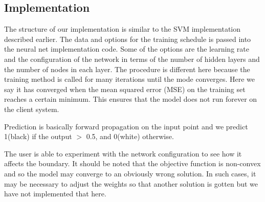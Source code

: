 \documentclass[11pt,letterpaper]{article}
\begin{document}
\subsection{Implementation}
The structure of our implementation is similar to the SVM implementation described earlier. The data and options for the training schedule is passed into the neural net implementation code. Some of the options are the learning rate and the configuration of the network in terms of the number of hidden layers and the number of nodes in each layer.  The procedure is different here because the training method is called for many iterations until the mode converges. Here we say it has converged when the mean squared error (MSE) on the training set reaches a certain minimum. This ensures that the model does not run forever on the client system. 

Prediction is basically forward propagation on the input point and we predict 1(black) if the output $>$ 0.5, and 0(white) otherwise.

The user is able to experiment with the network configuration to see how it affects the boundary. It should be noted that the objective function is non-convex and so the model may converge to an obviously wrong solution. In such cases, it may be necessary to adjust the weights so that another solution is gotten but we have not implemented that here.
\end{document}
